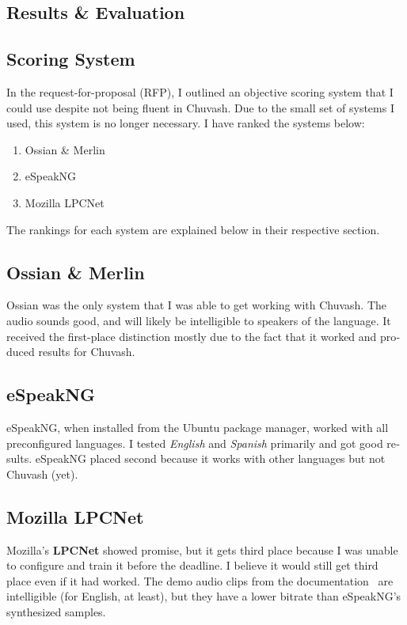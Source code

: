 \documentclass[11pt,a4paper]{article}
\begin{document}
\begin{otherlanguage}{english}
\section{Results \& Evaluation}\label{sect:results}
\subsection{Scoring System}
In the request-for-proposal (RFP), I outlined an objective scoring system that I could use despite not being fluent in Chuvash. Due to the small set of systems I used, this system is no longer necessary. I have ranked the systems below:
\begin{enumerate}
	\item Ossian \& Merlin
	\item eSpeakNG
	\item Mozilla LPCNet
\end{enumerate}

The rankings for each system are explained below in their respective section.

\subsection{Ossian \& Merlin}
Ossian was the only system that I was able to get working with Chuvash. The audio sounds good, and will likely be intelligible to speakers of the language. It received the first-place distinction mostly due to the fact that it worked and produced results for Chuvash.

\subsection{eSpeakNG}
eSpeakNG, when installed from the Ubuntu package manager, worked with all preconfigured languages. I tested \textit{English} and \textit{Spanish} primarily and got good results. eSpeakNG placed second because it works with other languages but not Chuvash (yet).

\subsection{Mozilla LPCNet}
Mozilla's \textbf{LPCNet} showed promise, but it gets third place because I was unable to configure and train it before the deadline. I believe it would still get third place even if it had worked. The demo audio clips from the documentation~\cite{lpcnet-doc} are intelligible (for English, at least), but they have a lower bitrate than eSpeakNG's synthesized samples.


\end{otherlanguage}
\end{document}
